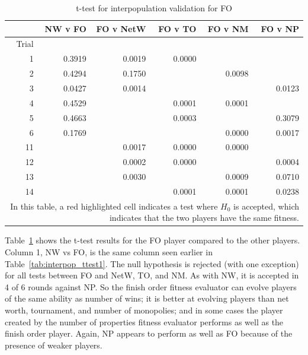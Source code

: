 \begin{table}[htbp]
  \centering
  \caption{t-test for interpopulation validation for FO}
    \begin{tabular}{rrrrrr}
    \toprule
          & NW v FO & FO v NetW & FO v TO & FO v NM & FO v NP \\
    \midrule
    Trial &        &        &        &        &        \\
    1     & \cellcolor{red!55!white}0.3919 & 0.0019 & 0.0000 &        &       
    \\
    2     & \cellcolor{red!55!white}0.4294 & \cellcolor{red!55!white}0.1750 &   
    & 0.0098 &
    \\
    3     & \cellcolor{red!55!white}0.0427 & 0.0014 &        &        &
    \cellcolor{red!55!white}0.0123
    \\
    4     & \cellcolor{red!55!white}0.4529 &        & 0.0001 & 0.0001 &       
    \\
    5     & \cellcolor{red!55!white}0.4663 &        & 0.0003 &        &
    \cellcolor{red!55!white}0.3079
    \\
    6     & \cellcolor{red!55!white}0.1769 &        &        & 0.0000 & 0.0017
    \\
    11    &        & 0.0017 & 0.0000 & 0.0000 &        \\
    12    &        & 0.0002 & 0.0000 &        & 0.0004 \\
    13    &        & 0.0030 &        & 0.0009 & \cellcolor{red!55!white}0.0710
    \\
    14    &        &        & 0.0001 & 0.0001 & \cellcolor{red!55!white}0.0238
    \\
    \bottomrule
  \multicolumn{6}{p{0.75\linewidth}}{In this table, a red highlighted cell
  indicates a test where $H_{0}$ is accepted, which indicates that the two
  players have the same fitness.}
    \end{tabular}%
  \label{tab:interpop_ttest2}%
\end{table}%

Table~\ref{tab:interpop_ttest2} shows the t-test results for the FO player
compared to the other players. Column 1, NW vs FO, is the same column seen
earlier in Table~\ref{tab:interpop_ttest1}. The null hypothesis is rejected
(with one exception) for all tests between FO and NetW, TO, and NM. As with NW,
it is accepted in 4 of 6 rounds against NP. So the finish order fitness
evaluator can evolve players of the same ability as number of wins; it is better
at evolving players than net worth, tournament, and number of monopolies; and in
some cases the player created by the number of properties fitness evaluator
performs as well as the finish order player. Again, NP appears to perform as
well as FO because of the presence of weaker players.

